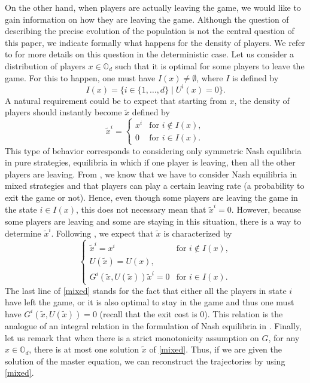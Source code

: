 \documentclass[10pt]{amsart}
\let\sep\mid
\theoremstyle{definition}
\begin{document}
On the other hand, when players are actually leaving the game, we would like to gain information on how they are leaving the game. Although the question of describing the precise evolution of the population is not the central question of this paper, we indicate formally what happens for the density of players. We refer to \cite{bertucci2018optimal} for more details on this question in the deterministic case. Let us consider a distribution of players $x \in \mathbb{O}_d$ such that it is optimal for some players to leave the game. For this to happen, one must have $ I(x)\ne \emptyset $, where $I$ is defined by
\begin{equation}\label{defI}
I(x) = \{ i \in \{1,\dots,d\} \sep U^i(x) = 0 \}.
\end{equation}
A natural requirement could be to expect that starting from $x$, the density of players should instantly become $\tilde{x}$ defined by
\begin{equation}\label{pure}
\tilde{x}^i = \begin{cases}
x^i &\text{for } i \notin I(x),\\
0 &\text{for } i \in I(x).
\end{cases}
\end{equation}
This type of behavior corresponds to considering only symmetric Nash equilibria in pure strategies, \ie equilibria in which if one player is leaving, then all the other players are leaving. From \cite{bertucci2018optimal}, we know that we have to consider Nash equilibria in mixed strategies and that players can play a certain leaving rate (a probability to exit the game or not). Hence, even though some players are leaving the game in the state $i \in I(x)$, this does not necessary mean that $\tilde{x}^i = 0$. However, because some players are leaving and some are staying in this situation, there is a way to determine $\tilde{x}^i$. Following \cite{bertucci2018optimal}, we expect that $\tilde{x}$ is characterized by
\begin{equation}\label{mixed}
\begin{cases}
\tilde{x}^i = x^i &\text{for } i \notin I(x),\\
U(\tilde{x}) = U(x),\\
G^i (\tilde{x}, U(\tilde{x}))\tilde{x}^i = 0 &\text{for } i \in I(x).
\end{cases}
\end{equation}
The last line of \eqref{mixed} stands for the fact that either all the players in state $i$ have left the game, or it is also optimal to stay in the game and thus one must have $G^i (\tilde{x}, U(\tilde{x})) = 0$ (recall that the exit cost is $0$). This relation is the analogue of an integral relation in the formulation of Nash equilibria in \cite{bertucci2018optimal}. Finally, let us remark that when there is a strict monotonicity assumption on $G$, for any $x \in \mathbb{O}_d$, there is at most one solution $\tilde{x}$ of \eqref{mixed}. Thus, if we are given the solution of the master equation, we can reconstruct the trajectories by using \eqref{mixed}.
\end{document}
